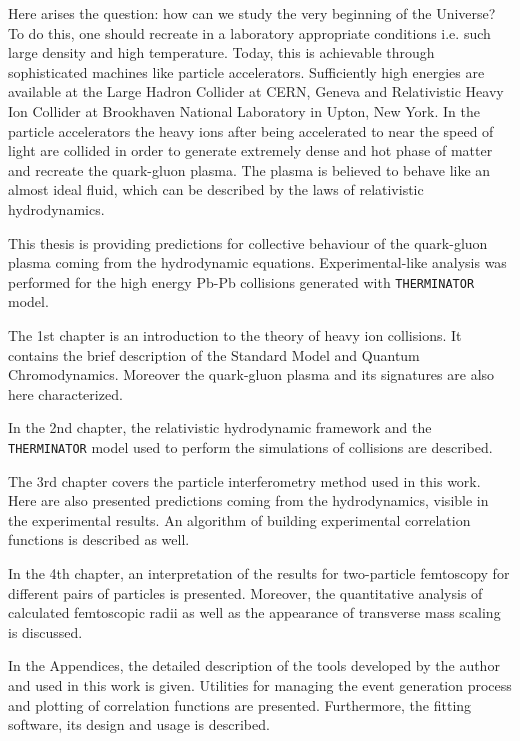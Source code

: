 Here arises the question: how can we study the very beginning of the Universe?
To do this, one should recreate in a laboratory appropriate conditions i.e. such large density and high temperature.
Today, this is achievable through sophisticated machines like particle accelerators.
Sufficiently high energies are available at the Large Hadron Collider at CERN, Geneva and Relativistic Heavy Ion Collider at Brookhaven National Laboratory in Upton, New York.
In the particle accelerators the heavy ions after being accelerated to near the speed of light are collided in order to generate extremely dense and hot phase of matter and recreate the quark-gluon plasma.
The plasma is believed to behave like an almost ideal fluid, which can be described by the laws of relativistic hydrodynamics.

This thesis is providing predictions for collective behaviour of the quark-gluon plasma coming from the hydrodynamic equations.
Experimental-like analysis was performed for the high energy Pb-Pb collisions generated with \verb|THERMINATOR| model.

The 1st chapter is an introduction to the theory of heavy ion collisions.
It contains the brief description of the Standard Model and Quantum Chromodynamics.
Moreover the quark-gluon plasma and its signatures are also here characterized.

In the 2nd chapter, the relativistic hydrodynamic framework and the \verb|THERMINATOR| model used to perform the simulations of collisions are described.

The 3rd chapter covers the particle interferometry method used in this work.
Here are also presented predictions coming from the hydrodynamics, visible in the experimental results.
An algorithm of building experimental correlation functions is described as well.

In the 4th chapter, an interpretation of the results for two-particle femtoscopy for different pairs of particles is presented.
Moreover, the quantitative analysis of calculated femtoscopic radii as well as the appearance of transverse mass scaling is discussed.

In the Appendices, the detailed description of the tools developed by the author and used in this work is given.
Utilities for managing the event generation process and plotting of correlation functions are presented.
Furthermore, the fitting software, its design and usage is described.